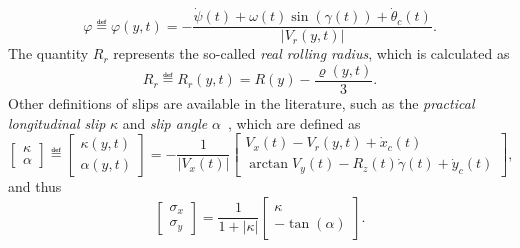 %
\begin{equation}
  \varphi \eqdef \varphi(y,t) = -\dfrac{\dot{\psi}(t) + \omega(t)\sin(\gamma(t)) + \dot{\theta}_c(t)}{|V_r(y,t)|}.
\end{equation}
%
The quantity $R_r$ represents the so-called \emph{real rolling radius}, which is calculated as
%
\begin{equation}
  R_r \eqdef R_r(y,t) = R(y) - \dfrac{\varrho(y,t)}{3}.
\end{equation}
%
Other definitions of slips are available in the literature, such as the \emph{practical longitudinal slip} $\kappa$ and \emph{slip angle} $\alpha$~\cite{pacejka2012tire}, which are defined as
%
\begin{equation}
  \begin{bmatrix}
    \kappa \\[0.2em]
    \alpha
  \end{bmatrix}
  \eqdef
  \begin{bmatrix}
    \kappa(y,t) \\[0.2em]
    \alpha(y,t)
  \end{bmatrix}
  =
  -\dfrac{1}{|V_x(t)|}
  \begin{bmatrix}
    V_x(t) - V_r(y,t) + \dot{x}_c(t) \\[0.2em]
    \arctan{V_y(t) - R_z(t)\dot{\gamma}(t) + \dot{y}_c(t)}
  \end{bmatrix},
\end{equation}
%
and thus
%
\begin{equation}
    \begin{bmatrix}
    \sigma_x \\[0.2em]
    \sigma_y
  \end{bmatrix}
  =
  \dfrac{1}{1 + |\kappa|}
  \begin{bmatrix}
    \kappa \\[0.2em]
    -\tan(\alpha)
  \end{bmatrix}.
\end{equation}

